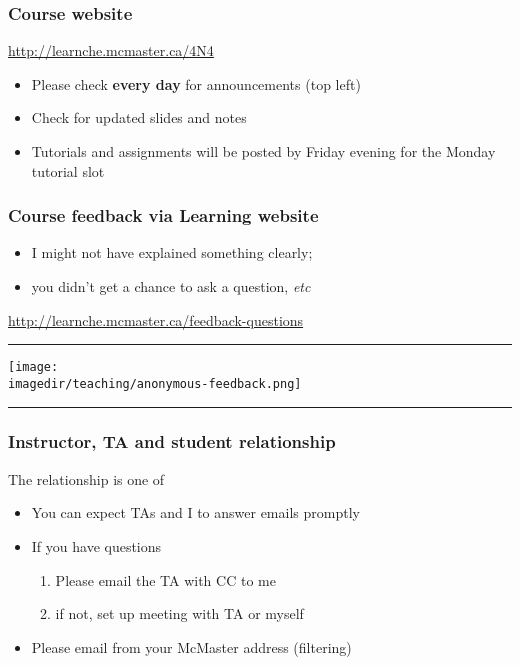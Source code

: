 \begin{frame}\frametitle{Course website}	
	\begin{exampleblock}{}
		\centering 
		\href{http://learnche.mcmaster.ca/4N4}{http://learnche.mcmaster.ca/4N4}
	\end{exampleblock}
	\begin{itemize}
		\item	Please check \textbf{every day} for announcements {\tiny (top left)}
		\item	Check for updated slides and notes
		\item	Tutorials and assignments will be posted by Friday evening for the Monday tutorial slot
	\end{itemize}
\end{frame}

\begin{frame}\frametitle{Course feedback via Learning website}
	\begin{itemize}
		\item	I might not have explained something clearly;  
		\item	you didn't get a chance to ask a question, \emph{etc}		
	\end{itemize}
	\href{http://learnche.mcmaster.ca/feedback-questions}{http://learnche.mcmaster.ca/feedback-questions}
	\vspace{12pt}
	\hrule
	\begin{center}
		\texttt{[image: \\imagedir/teaching/anonymous-feedback.png]}
	\end{center}
	\hrule
\end{frame}

\begin{frame}\frametitle{Instructor, TA and student relationship}
	\begin{exampleblock}{}
		The relationship is one of {}
	\end{exampleblock}
	
	\begin{itemize}
		\item	You can expect TAs and I to answer emails promptly
		\item	If you have questions
			\begin{enumerate}
				\item	Please email the TA with CC to me \hfill {\tiny{\color{myOrange}{$\longleftarrow$ hopefully this solves your problem}}}
				\item	if not, set up meeting with TA or myself
			\end{enumerate}
		\item	Please email from your McMaster address (filtering)
	\end{itemize}
\end{frame}

